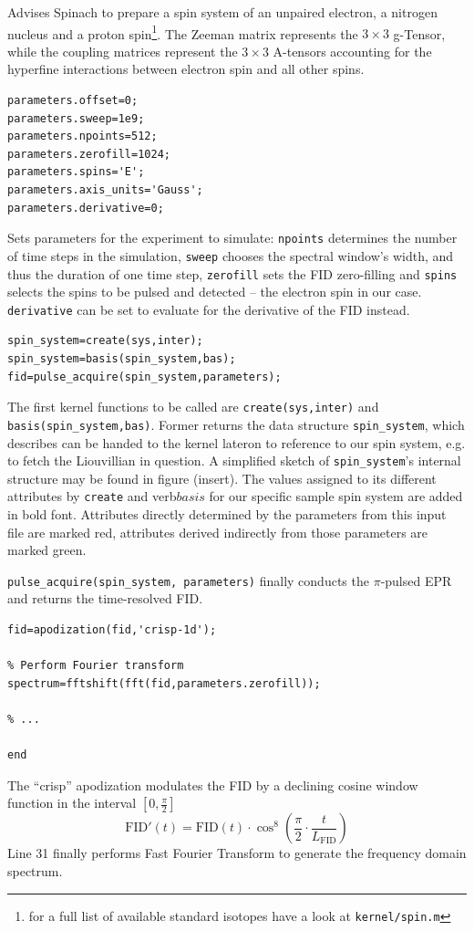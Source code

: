 \documentclass[11.5pt,a4paper]{article}
\begin{document}
Advises Spinach to prepare a spin system of an unpaired electron, a nitrogen nucleus and a proton spin\footnote{for a full list of available standard isotopes have a look at \verb$kernel/spin.m$}. The Zeeman matrix represents the $3\times 3$ g-Tensor, while the coupling matrices represent the $3\times 3$ A-tensors accounting for the hyperfine interactions between electron spin and all other spins.
\begin{lstlisting}[firstnumber=last]
% Set the sequence parameters
parameters.offset=0;
parameters.sweep=1e9;
parameters.npoints=512;
parameters.zerofill=1024;
parameters.spins='E';
parameters.axis_units='Gauss';
parameters.derivative=0;
\end{lstlisting}
Sets parameters for the experiment to simulate: \verb$npoints$ determines the number of time steps in the simulation, \verb$sweep$ chooses the spectral window's width, and thus the duration of one time step, \verb$zerofill$ sets the FID zero-filling and \verb$spins$ selects the spins to be pulsed and detected -- the electron spin in our case. \verb$derivative$ can be set to evaluate for the derivative of the FID instead.

\begin{lstlisting}[firstnumber=last]
% Run Spinach
spin_system=create(sys,inter);
spin_system=basis(spin_system,bas);
fid=pulse_acquire(spin_system,parameters);
\end{lstlisting}
The first kernel functions to be called are \verb$create(sys,inter)$ and \verb$basis(spin_system,bas)$. Former returns the data structure \verb$spin_system$, which describes  can be handed to the kernel lateron to reference to our spin system, e.g. to fetch the Liouvillian in question. A simplified sketch of \verb$spin_system$'s internal structure may be found in figure (insert). The values assigned to its different attributes by \verb$create$ and verb$basis$ for our specific sample spin system are added in bold font. Attributes directly determined by the parameters from this input file are marked red, attributes derived indirectly from those parameters are marked green.
 
\verb$pulse_acquire(spin_system, parameters)$ finally conducts the $\pi$-pulsed EPR and returns the time-resolved FID.
\begin{lstlisting}[firstnumber=last]
% Apodization
fid=apodization(fid,'crisp-1d');

% Perform Fourier transform
spectrum=fftshift(fft(fid,parameters.zerofill));

% ...

end
\end{lstlisting}
The ``crisp'' apodization modulates the FID by a declining cosine window function in the interval $[0,\tfrac{\pi}{2}]$
\begin{equation}
 \text{FID}'(t) = \text{FID}(t) \cdot \cos^8 \left( \frac{\pi}{2} \cdot \frac{t}{L_\text{FID}} \right)
\end{equation}
Line 31 finally performs Fast Fourier Transform to generate the frequency domain spectrum.
\end{document}
